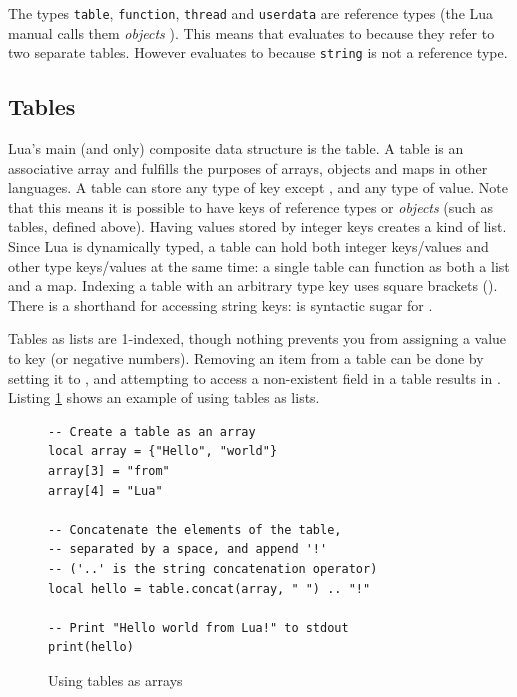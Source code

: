 The types \texttt{table}, \texttt{function}, \texttt{thread} and \texttt{userdata} are reference types (the Lua manual calls them \textit{objects} \cite[\S 2.1]{luareferencemanual}). This means that \lua{{} == {}} evaluates to  because they refer to two separate tables. However  evaluates to  because \texttt{string} is not a reference type.

\subsection{Tables}
Lua's main (and only) composite data structure is the table. A table is an associative array and fulfills the purposes of arrays, objects and maps in other languages. A table can store any type of key except , and any type of value. Note that this means it is possible to have keys of reference types or \textit{objects} (such as tables, defined above). Having values stored by integer keys creates a kind of list. Since Lua is dynamically typed, a table can hold both integer keys/values and other type keys/values at the same time: a single table can function as both a list and a map. Indexing a table with an arbitrary type key uses square brackets (). There is a shorthand for accessing string keys:  is syntactic sugar for .

Tables as lists are 1-indexed, though nothing prevents you from assigning a value to key  (or negative numbers). Removing an item from a table can be done by setting it to , and attempting to access a non-existent field in a table results in . Listing \ref{lst:lua_tables} shows an example of using tables as lists.

\begin{figure}[ht]
\centering
\begin{verbatim}
-- Create a table as an array
local array = {"Hello", "world"}
array[3] = "from"
array[4] = "Lua"

-- Concatenate the elements of the table,
-- separated by a space, and append '!'
-- ('..' is the string concatenation operator)
local hello = table.concat(array, " ") .. "!"

-- Print "Hello world from Lua!" to stdout
print(hello)
\end{verbatim}
\caption{Using tables as arrays}
\label{lst:lua_tables}
\end{figure}

